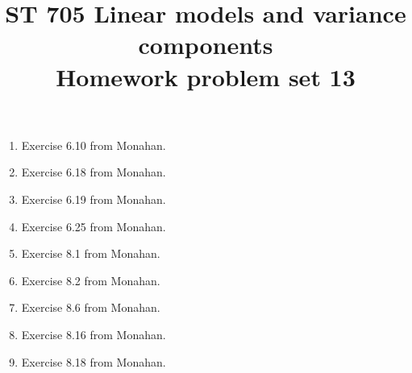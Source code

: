 \documentclass[11pt]{article}
\title{ST 705 Linear models and variance components \\ 
        Homework problem set 13}
\begin{document}
\maketitle

\begin{enumerate}

\item Exercise 6.10 from Monahan.

\item Exercise 6.18 from Monahan.

\item Exercise 6.19 from Monahan.

\item Exercise 6.25 from Monahan.

\item Exercise 8.1 from Monahan.

\item Exercise 8.2 from Monahan.

\item Exercise 8.6 from Monahan.

\item Exercise 8.16 from Monahan.

\item Exercise 8.18 from Monahan.



\end{enumerate}
\end{document}
